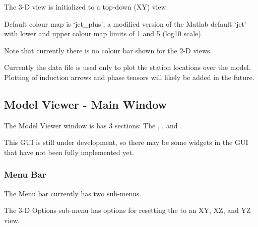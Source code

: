 \documentclass[letterpaper,10pt,english]{sphinxmanual}
\begin{document}
The 3-D view is initialized to a top-down (XY) view.

Default colour map is ‘jet\_plus’, a modified version of the Matlab default ‘jet’ with lower and upper colour map limits of 1 and 5 (log10 scale).

Note that currently there is no colour bar shown for the 2-D views.

Currently the data file is used only to plot the station locations over the model. Plotting of induction arrows and phase tensors will likely be added in the future.


\subsection{Model Viewer - Main Window}
\label{\detokenize{content/model_viewer/main_window:model-viewer-main-window}}\label{\detokenize{content/model_viewer/main_window:model-viewer}}\label{\detokenize{content/model_viewer/main_window::doc}}
\begin{figure}[htbp]
\centering

\noindent{}
\end{figure}

The Model Viewer window is has 3 sections: The {\hyperref[\detokenize{content/model_viewer/main_window:menu-bar}]{}}, {\hyperref[\detokenize{content/model_viewer/main_window:control-dock}]{}}, and {\hyperref[\detokenize{content/model_viewer/main_window:plot-window}]{}}.

This GUI is still under development, so there may be some widgets in the GUI that have not been fully implemented yet.


\subsubsection{Menu Bar}
\label{\detokenize{content/model_viewer/main_window:menu-bar}}
\begin{figure}[htbp]
\centering

\noindent{}
\end{figure}

The Menu bar currently has two sub-menus.

The 3-D Options sub-menu has options for resetting the {\hyperref[\detokenize{content/model_viewer/main_window:d-view}]{}} to an XY, XZ, and YZ view.
\end{document}
